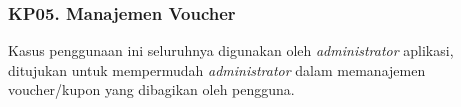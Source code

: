 \subsubsection{KP05. Manajemen Voucher}
\label{kp05}

	Kasus penggunaan ini seluruhnya digunakan oleh \textit{administrator} aplikasi, ditujukan untuk mempermudah \textit{administrator} dalam memanajemen voucher/kupon yang dibagikan oleh pengguna.

	
	
	
	
	